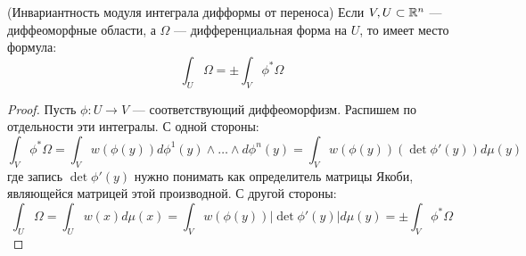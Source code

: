 \begin{proposition} (Инвариантность модуля интеграла дифформы от переноса)
	Если $V, U \subset \mathbb{R}^n$ --- диффеоморфные области, а $\Omega$ --- дифференциальная форма на $U$, то имеет место формула:
	\[
		\int_U \Omega = \pm\int_V \phi^*\Omega
	\]
\end{proposition}

\begin{proof}
	Пусть $\phi \colon U \to V$ --- соответствующий диффеоморфизм. Распишем по отдельности эти интегралы. С одной стороны:
	\[
		\int_V \phi^*\Omega = \int_V w(\phi(y))d\phi^1(y) \wedge \ldots \wedge d\phi^n(y) = \int_V w(\phi(y))(\det \phi'(y))d\mu(y)
	\]
	где запись $\det \phi'(y)$ нужно понимать как определитель матрицы Якоби, являющейся матрицей этой производной. С другой стороны:
	\[
		\int_U \Omega = \int_U w(x)d\mu(x) = \int_V w(\phi(y)) |\det \phi'(y)|d\mu(y) = \pm \int_V \phi^*\Omega
	\]
\end{proof}